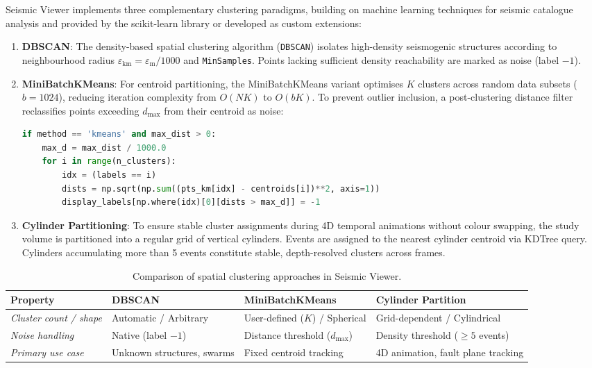 Seismic Viewer implements three complementary clustering paradigms, building on machine learning techniques for seismic catalogue analysis \cite{bergen2019machine} and provided by the scikit-learn library \cite{pedregosa2011sklearn} or developed as custom extensions:
\begin{enumerate}
    \item \textbf{DBSCAN}: The density-based spatial clustering algorithm \cite{ester1996dbscan} (\texttt{DBSCAN}) isolates high-density seismogenic structures according to neighbourhood radius $\varepsilon_\text{km} = \varepsilon_\text{m}/1000$ and \texttt{MinSamples}. Points lacking sufficient density reachability are marked as noise (label $-1$).
    \item \textbf{MiniBatchKMeans}: For centroid partitioning, the MiniBatchKMeans variant \cite{lloyd1982kmeans} optimises $K$ clusters across random data subsets ($b=1024$), reducing iteration complexity from $O(NK)$ to $O(bK)$. To prevent outlier inclusion, a post-clustering distance filter reclassifies points exceeding $d_\text{max}$ from their centroid as noise:
    \begin{lstlisting}[language=Python, caption={Post-clustering distance filter for KMeans.}, label={lst:kmeans-filter}]
if method == 'kmeans' and max_dist > 0:
    max_d = max_dist / 1000.0
    for i in range(n_clusters):
        idx = (labels == i)
        dists = np.sqrt(np.sum((pts_km[idx] - centroids[i])**2, axis=1))
        display_labels[np.where(idx)[0][dists > max_d]] = -1
    \end{lstlisting}
    \item \textbf{Cylinder Partitioning}: To ensure stable cluster assignments during 4D temporal animations without colour swapping, the study volume is partitioned into a regular grid of vertical cylinders. Events are assigned to the nearest cylinder centroid via KDTree query. Cylinders accumulating more than 5 events constitute stable, depth-resolved clusters across frames.
\end{enumerate}

\begin{table}[htbp]
\centering
\caption{Comparison of spatial clustering approaches in Seismic Viewer.}
\label{tab:clustering-comparison}
\footnotesize
\renewcommand{\arraystretch}{1.15}
\begin{tabularx}{\textwidth}{@{}l >{\raggedright\arraybackslash}X >{\raggedright\arraybackslash}X >{\raggedright\arraybackslash}X@{}}
\toprule
\textbf{Property} & \textbf{DBSCAN} & \textbf{MiniBatchKMeans} & \textbf{Cylinder Partition} \\
\midrule
\textit{Cluster count / shape} & Automatic / Arbitrary & User-defined ($K$) / Spherical & Grid-dependent / Cylindrical \\
\addlinespace
\textit{Noise handling} & Native (label $-1$) & Distance threshold ($d_\text{max}$) & Density threshold ($\geq 5$ events) \\
\addlinespace
\textit{Primary use case} & Unknown structures, swarms & Fixed centroid tracking & 4D animation, fault plane tracking \\
\bottomrule
\end{tabularx}
\end{table}

